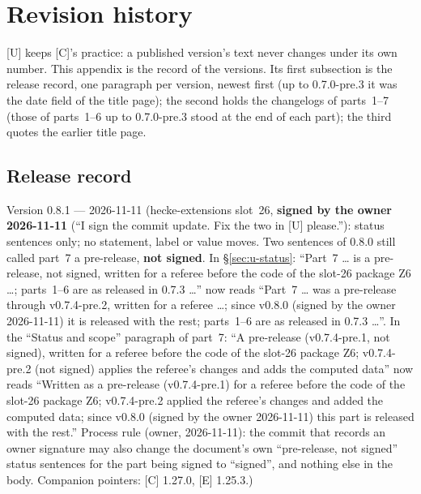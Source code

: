 \documentclass[11pt]{article}
\begin{document}
\section{Revision history}\label{app:u-history}
[U] keeps [C]'s practice: a published version's text never changes under its own number. This appendix is the record of the
versions. Its first subsection is the release record, one paragraph per version, newest first (up to 0.7.0-pre.3 it was the date
field of the title page); the second holds the changelogs of parts~1--7 (those of parts~1--6 up to 0.7.0-pre.3 stood at the end of each part); the
third quotes the earlier title page.

\subsection{Release record}
Version 0.8.1 --- 2026-11-11 (hecke-extensions slot~26, \textbf{signed by the owner 2026-11-11} (``I sign the commit update. Fix the two in [U] please.''): status sentences only; no statement, label or value moves. Two sentences of 0.8.0 still called part~7 a pre-release, \textbf{not signed}. In \S\ref{sec:u-status}: ``Part~7 \dots{} is a pre-release, not signed, written for a referee before the code of the slot-26 package Z6 \dots; parts~1--6 are as released in 0.7.3 \dots'' now reads ``Part~7 \dots{} was a pre-release through v0.7.4-pre.2, written for a referee \dots; since v0.8.0 (signed by the owner 2026-11-11) it is released with the rest; parts~1--6 are as released in 0.7.3 \dots''. In the ``Status and scope'' paragraph of part~7: ``A pre-release (v0.7.4-pre.1, not signed), written for a referee before the code of the slot-26 package Z6; v0.7.4-pre.2 (not signed) applies the referee's changes and adds the computed data'' now reads ``Written as a pre-release (v0.7.4-pre.1) for a referee before the code of the slot-26 package Z6; v0.7.4-pre.2 applied the referee's changes and added the computed data; since v0.8.0 (signed by the owner 2026-11-11) this part is released with the rest.'' Process rule (owner, 2026-11-11): the commit that records an owner signature may also change the document's own ``pre-release, not signed'' status sentences for the part being signed to ``signed'', and nothing else in the body. Companion pointers: [C] 1.27.0, [E] 1.25.3.)
\end{document}

